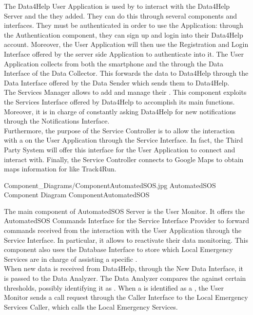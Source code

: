 \documentclass[../../DD.tex]{subfiles}
\begin{document}
	The Data4Help User Application is used by  to interact with the Data4Help Server and the  they added. They can do this through several components and interfaces. They must be authenticated in order to use the Application: through the Authentication component, they can sign up and login into their Data4Help account. Moreover, the User Application will then use the Registration and Login Interface offered by the server side Application to authenticate into it.
	The User Application collects  from both the smartphone and the  through the Data Interface of the Data Collector. This forwards the data to Data4Help through the Data Interface offered by the Data Sender which sends them to Data4Help.\\
	The Services Manager allows  to add and manage their . This component exploits the Services Interface offered by Data4Help to accomplish its main functions. Moreover, it is in charge of constantly asking Data4Help for new notifications through the Notifications Interface.\\
	Furthermore, the purpose of the Service Controller is to allow the interaction with a  on the User Application through the Service Interface. In fact, the Third Party System will offer this interface for the User Application to connect and interact with. Finally, the Service Controller connects to Google Maps to obtain maps information for  like Track4Run.

	\image {13cm} {Component_Diagrams/ComponentAutomatedSOS.jpg} {AutomatedSOS Component Diagram} {ComponentAutomatedSOS}

	The main component of AutomatedSOS Server is the User Monitor. It offers the AutomatedSOS Commands Interface for the Service Interface Provider to forward commands received from the interaction with the User Application through the Service Interface. In particular, it allows  to reactivate their data monitoring. This component also uses the Database Interface to store which Local Emergency Services are in charge of assisting a specific .\\
	When new data is received from Data4Help, through the New Data Interface, it is passed to the Data Analyzer. The Data Analyzer compares the  against certain thresholds, possibly identifying it as . When a  is identified as a , the User Monitor sends a call request through the Caller Interface to the Local Emergency Services Caller, which calls the Local Emergency Services.
\end{document}
